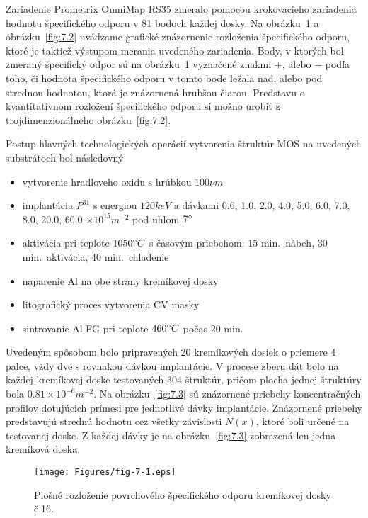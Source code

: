 Zariadenie Prometrix OmniMap RS35 zmeralo pomocou krokovacieho
zariadenia hodnotu špecifického odporu v 81 bodoch každej dosky. Na
obrázku~\ref{fig:7.1} a obrázku~\ref{fig:7.2} uvádzame grafické
znázornenie rozloženia špecifického odporu, ktoré je taktiež výstupom
merania uvedeného zariadenia. Body, v ktorých bol zmeraný špecifický
odpor sú na obrázku~\ref{fig:7.1} vyznačené znakmi $+$, alebo $-$
podľa toho, či hodnota špecifického odporu v tomto bode ležala nad,
alebo pod strednou hodnotou, ktorá je znázornená hrubšou čiarou.
Predstavu o kvantitatívnom rozložení špecifického odporu si možno
urobiť z trojdimenzionálneho obrázku~\ref{fig:7.2}.

Postup hlavných technologických operácií vytvorenia štruktúr MOS na
uvedených substrátoch bol následovný

\begin{itemize}
\item vytvorenie hradloveho oxidu s hrúbkou $100 \nu m$
\item implantácia $P^{31}$ s energiou $120 keV$ a dávkami 0.6, 1.0,
  2.0, 4.0, 5.0, 6.0, 7.0, 8.0, 20.0, 60.0 $\times 10^{15} m^{-2}$ pod
  uhlom $7\degree$
\item aktivácia pri teplote $1050 \degree C$ s časovým priebehom: 15
  min.\ nábeh, 30 min.\ aktivácia, 40 min.\ chladenie
\item naparenie Al na obe strany kremíkovej dosky
\item litografický proces vytvorenia CV masky
\item sintrovanie Al FG pri teplote $460 \degree C$ počas 20 min.
\end{itemize}

Uvedeným spôsobom bolo pripravených 20 kremíkových dosiek o priemere 4
palce, vždy dve s rovnakou dávkou implantácie.  V procese zberu dát
bolo na každej kremíkovej doske testovaných 304 štruktúr, pričom
plocha jednej štruktúry bola $0.81 \times 10^{-6} m^{-2}$. Na
obrázku~\ref{fig:7.3} sú znázornené priebehy koncentračných profilov
dotujúcich prímesi pre jednotlivé dávky implantácie. Znázornené
priebehy predstavujú strednú hodnotu cez všetky závislosti $N(x)$,
ktoré boli určené na testovanej doske. Z každej dávky je na
obrázku~\ref{fig:7.3} zobrazená len jedna kremíková doska.

\newpage
\begin{figure}[h!]\centering
  \texttt{[image: Figures/fig-7-1.eps]}%
  \caption[Plošné rozloženie povrchového špecifického odporu
    kremíkovej dosky č.16]{Plošné rozloženie povrchového špecifického
    odporu kremíkovej dosky č.16.}\label{fig:7.1}
\end{figure}

